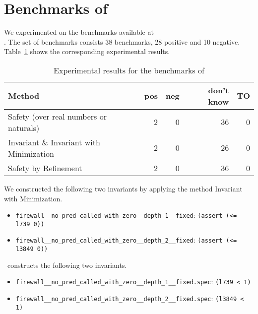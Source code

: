 \documentclass{llncs}
\begin{document}
\section{Benchmarks of \iic}

We experimented on the benchmarks available at \\
.
The set of benchmarks consists 38 benchmarks, 28 positive and 10 negative.
Table~\ref{iic-experiments} shows the corresponding experimental results.

\begin{table}[h]
\begin{center}
  \begin{tabular}{ | p{6cm} | r | r | r | r | }
    \hline
    Method & pos & neg & don't know & TO \\
    \hline
    Safety (over real numbers or naturals)      & 2 & 0 & 36 & 0 \\
    Invariant \& Invariant with Minimization    & 2 & 0 & 26 & 0 \\
    Safety by Refinement                        & 2 & 0 & 36 & 0 \\
    \hline
  \end{tabular}
\end{center}
\caption{Experimental results for the benchmarks of \iic}
\label{iic-experiments}
\end{table}

We constructed the following two invariants by applying the method
Invariant with Minimization.

\begin{itemize}
\item \verb?firewall__no_pred_called_with_zero__depth_1__fixed?: \verb?(assert (<= l739 0))?
\item \verb?firewall__no_pred_called_with_zero__depth_2__fixed?: \verb?(assert (<= l3849 0))?
\end{itemize}

\iic\ constructs the following two invariants.

\begin{itemize}
\item \verb=firewall__no_pred_called_with_zero__depth_1__fixed.spec=: \verb=(l739 < 1)=
\item \verb=firewall__no_pred_called_with_zero__depth_2__fixed.spec=: \verb=(l3849 < 1)=
\end{itemize}

\fi
\end{document}
